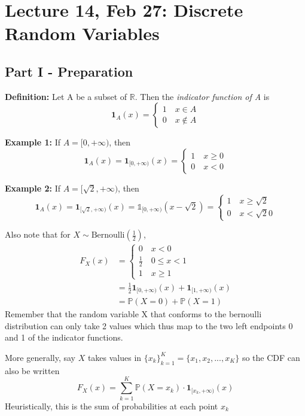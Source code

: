 \documentclass[12pt]{article}
\renewcommand{\P}{\mathbb{P}}
\newcommand{\R}{\mathbb{R}}
\begin{document}
\section*{Lecture 14, Feb 27: Discrete Random Variables}
\subsection*{Part I - Preparation}
\textbf{Definition:} Let A be a subset of $\R$. Then the \emph{indicator function of A} is 
\[\mathbf{1}_A(x) = \begin{cases}
    1 \quad x \in A\\
    0 \quad x \notin A
\end{cases}\]

\textbf{Example 1:}
If $A = [0, +\infty)$, then 
\[\mathbf{1}_A(x) = \mathbf{1}_{[0, +\infty)}(x) = \begin{cases}
    1 \quad x \geq 0\\
    0 \quad x < 0
\end{cases}\] 

\textbf{Example 2:}
If $A = [\sqrt{2}, +\infty)$, then 
\[\mathbf{1}_A(x) = \mathbf{1}_{[\sqrt{2}, +\infty)}(x) = \mathbb{1}_{[0, +\infty)}(x-\sqrt{2}) = \begin{cases}
    1 \quad x \geq \sqrt{2}\\
    0 \quad x <\sqrt{2}0
\end{cases}\] 

Also note that for $X \sim \text{Bernoulli}(\frac{1}{2})$, 
\begin{align*}
    F_X(x) &= \begin{cases}
        0 \quad x < 0\\
        \frac{1}{2} \quad 0 \leq x < 1\\
        1 \quad x \geq 1
    \end{cases} \\
    &= \frac{1}{2}\mathbf{1}_{[0, +\infty)}(x) + \mathbf{1}_{[1, +\infty)}(x) \\
    &= \P(X = 0) + \P(X = 1)
\end{align*}
Remember that the random variable X that conforms to the bernoulli distribution can only take 2 values which thus map to the two left endpoints 0 and 1 of the indicator functions.

More generally, say $X$ takes values in $\{x_k\}_{k=1}^K = \{x_1, x_2, ..., x_K\}$ so the CDF can also be written 
\[F_X(x) = \sum_{k=1}^K \P(X = x_k) \cdot \mathbf{1}_{[x_k, +\infty)}(x)\]
Heuristically, this is the sum of probabilities at each point $x_k$
\end{document}

